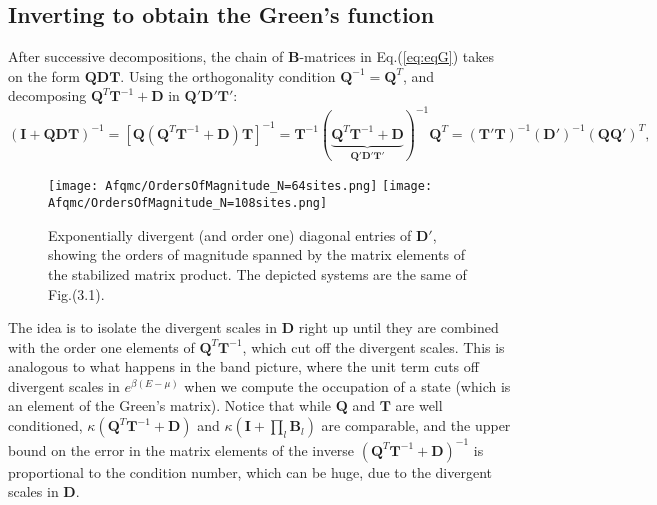 \subsection{Inverting to obtain the Green's function}
\label{subsec:invertToG}

After successive decompositions, the chain of $\bm B$-matrices in Eq.(\ref{eq:eqG}) takes on the form $\bm Q \bm D \bm T$.
Using the orthogonality condition $\bm Q^{-1} = \bm Q^T$, and decomposing $\bm Q^T \bm T^{-1} + \bm D$ in $\bm Q' \bm D' \bm T'$:
\begin{equation}
( \bm I + \bm Q \bm D \bm T )^{-1} = [ \bm Q ( 
\bm Q^T \bm T^{-1} + \bm D ) \bm T ]^{-1} = \bm T^{-1} ( \underbrace{\bm Q^T \bm T^{-1} + \bm D}_{\bm Q' \bm D' \bm T'} )^{-1} \bm Q^T = ( \bm T' \bm T )^{-1} (\bm D')^{-1} (\bm Q \bm Q')^{T} ,
\end{equation}
\begin{figure}[H]\label{fig:divergences}
\hspace{0.3cm}
\texttt{[image: Afqmc/OrdersOfMagnitude\_N=64sites.png]}
\hspace{0.3cm}
\texttt{[image: Afqmc/OrdersOfMagnitude\_N=108sites.png]}
\caption[Exponentially divergent diagonal entries of $\bm D'$, showing the orders of magnitude spanned by the matrix elements of the stabilized matrix product.]{Exponentially divergent (and order one)  diagonal entries of $\bm D'$, showing the orders of magnitude spanned by the matrix elements of the stabilized matrix product.
The depicted systems are the same of Fig.(3.1). }
\end{figure}

The idea is to isolate the divergent scales in $\bm D$ right up until they are combined with the order one elements of $\bm Q^T \bm T^{-1}$, which cut off the divergent scales.
This is analogous to what happens in the band picture, where the unit term cuts off divergent scales in $e^{\beta ( E - \mu )}$ when we compute the occupation of a state (which is an element of the Green's matrix).
Notice that while $\bm Q$ and $\bm T$ are well conditioned, $\kappa ( \bm Q^T \bm T^{-1} + \bm D )$ and $\kappa ( \bm I + \prod_l \bm B_l )$ are comparable, and the upper bound on the error in the matrix elements of the inverse $( \bm Q^T \bm T^{-1} + \bm D )^{-1}$ is proportional to the condition number, which can be huge, due to the divergent scales in $\bm D$.

